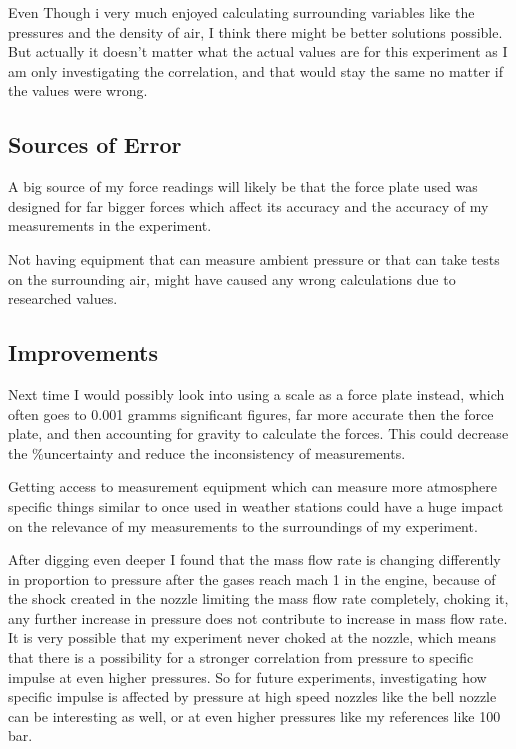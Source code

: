 \documentclass[12pt,a4paper]{article}
\begin{document}
Even Though i very much enjoyed calculating surrounding variables like the pressures and the density of air, I think there might be better solutions possible. But actually it doesn't matter what the actual values are for this experiment as I am only investigating the correlation, and that would stay the same no matter if the values were wrong.

\subsection{Sources of Error}

A big source of my force readings will likely be that the force plate used was designed for far bigger forces which affect its accuracy and the accuracy of my measurements in the experiment.

Not having equipment that can measure ambient pressure or that can take tests on the surrounding air, might have caused any wrong calculations due to researched values.

\subsection{Improvements}

Next time I would possibly look into using a scale as a force plate instead, which often goes to 0.001 gramms significant figures, far more accurate then the force plate, and then accounting for gravity to calculate the forces. This could decrease the \%uncertainty and reduce the inconsistency of measurements.

Getting access to measurement equipment which can measure more atmosphere specific things similar to once used in weather stations could have a huge impact on the relevance of my measurements to the surroundings of my experiment.

After digging even deeper I found that the mass flow rate is changing differently in proportion to pressure after the gases reach mach 1 in the engine, because of the shock created in the nozzle limiting the mass flow rate completely, choking it, any further increase in pressure does not contribute to increase in mass flow rate. It is very possible that my experiment never choked at the nozzle, which means that there is a possibility for a stronger correlation from pressure to specific impulse at even higher pressures. So for future experiments, investigating how specific impulse is affected by pressure at high speed nozzles like the bell nozzle can be interesting as well, or at even higher pressures like my references like 100 bar.
\end{document}
